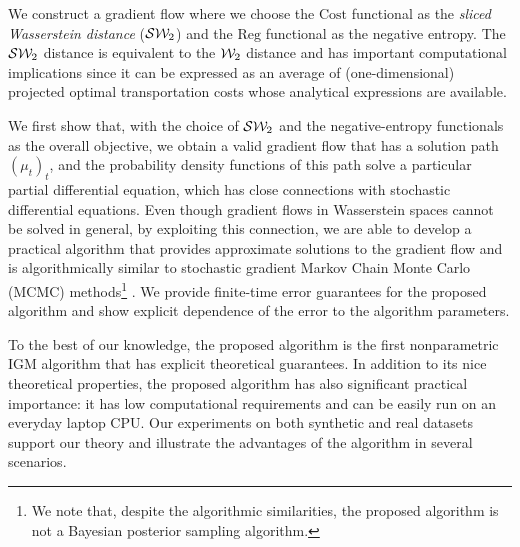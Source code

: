 We construct a gradient flow where we choose the $\mathrm{Cost}$ functional as the \textit{sliced Wasserstein distance} (${\cal S}{\cal W}_2$) \cite{bonneel2015sliced} and the $\mathrm{Reg}$ functional as the negative entropy. The ${\cal S}{\cal W}_2$ distance is equivalent to the ${\cal W}_2$ distance \cite{bonnotte2013unidimensional} and has important computational implications since it can be expressed as an average of (one-dimensional) projected optimal transportation costs whose analytical expressions are available.

We first show that, with the choice of ${\cal S}{\cal W}_2$ and the negative-entropy functionals as the overall objective, we obtain a valid gradient flow that has a solution path $(\mu_t)_t$, and the probability density functions of this path solve a particular partial differential equation, which has close connections with stochastic differential equations. Even though gradient flows in Wasserstein spaces cannot be solved in general, by exploiting this connection, we are able to develop a practical algorithm that provides approximate solutions to the gradient flow and is algorithmically similar to stochastic gradient Markov Chain Monte Carlo (MCMC) methods\footnote{We note that, despite the algorithmic similarities, the proposed algorithm is not a Bayesian posterior sampling algorithm.} \cite{WelTeh2011a,raginsky17a}. We provide finite-time error guarantees for the proposed algorithm and show explicit dependence of the error to the algorithm parameters.



To the best of our knowledge, the proposed algorithm is the first nonparametric IGM algorithm that has explicit theoretical guarantees. In addition to its nice theoretical properties, the proposed algorithm has also significant practical importance: it has low computational requirements and can be easily run on an everyday laptop CPU.
Our experiments on both synthetic and real datasets support our theory and illustrate the advantages of the algorithm in several scenarios.








